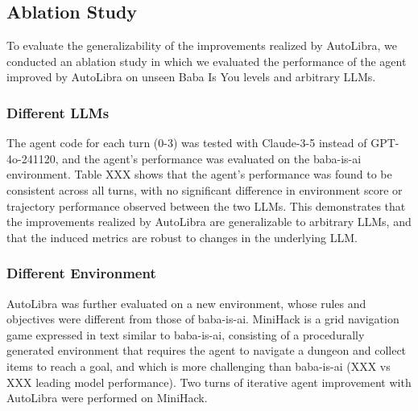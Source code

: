 \subsection{Ablation Study}

To evaluate the generalizability of the improvements realized by AutoLibra, we conducted an ablation study in which we evaluated the performance of the agent improved by AutoLibra on unseen Baba Is You levels and arbitrary LLMs.

\subsubsection{Different LLMs}

The agent code for each turn (0-3) was tested with Claude-3-5 instead of GPT-4o-241120, and the agent's performance was evaluated on the baba-is-ai environment. Table XXX shows that the agent's performance was found to be consistent across all turns, with no significant difference in environment score or trajectory performance observed between the two LLMs. This demonstrates that the improvements realized by AutoLibra are generalizable to arbitrary LLMs, and that the induced metrics are robust to changes in the underlying LLM.

\subsubsection{Different Environment}

AutoLibra was further evaluated on a new environment, whose rules and objectives were different from those of baba-is-ai. MiniHack is a grid navigation game expressed in text similar to baba-is-ai, consisting of a procedurally generated environment that requires the agent to navigate a dungeon and collect items to reach a goal, and which is more challenging than baba-is-ai (XXX vs XXX leading model performance). Two turns of iterative agent improvement with AutoLibra were performed on MiniHack.